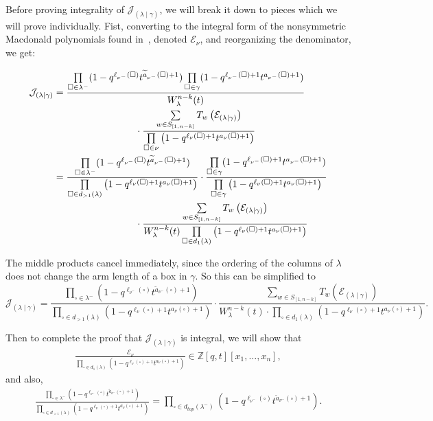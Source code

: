 \documentclass[ALCO]{cedram}
\newcommand{\Z}{\mathbb{Z}}
\newcommand{\Sn}{S_{[1,n-k]}}
\newcommand{\Symm}[1]{\sum\limits_{w\in \Sn} T_w \left( #1 \right)}
\newcommand{\JJ}{\mathcal{J}_{(\lambda \mid \gamma)}}
\newcommand{\nudom}{{( \lambda \mid \gamma )}}
\newcommand{\legnu}{{\ell_\nu(\square)}}
\newcommand{\legnumin}{{\ell_{\nu^-}(\square)}}
\newcommand{\armonenumin}{{\widetilde{a}_{\nu^-}(\square)}}
\newcommand{\armtwonu}{{a_\nu(\square)}}
\newcommand{\armtwonumin}{{a_{\nu^-}(\square)}}
\newcommand{\symmetricprod}{\prod\limits_{\square \in \lambda^-}}
\newcommand{\nonsymmetricprod}{\prod\limits_{\square \in \gamma}}
\begin{document}
Before proving integrality of $\JJ$, we will break it down to pieces which we will prove individually. Fist, converting to the integral form of the nonsymmetric Macdonald polynomials found in~\cite[Eqn. (6.11)]{MR2348910}, denoted $\mathcal{E}_\nu$, and reorganizing the denominator, we get:

\begin{align*}\JJ &= \frac{\symmetricprod (1-q^{\legnumin}t^{\armonenumin + 1}) \nonsymmetricprod(1-q^{\legnumin + 1}t^{\armtwonumin + 1})}{  W^{n-k}_\lambda(t)} \\ &\hspace*{3cm} \cdot \frac{\Symm{\mathcal{E}_\nudom}}{\prod\limits_{\square \in \nu} \left(1-q^{\legnu+1}t^{\armtwonu +1} \right)} \\
&= \frac{\symmetricprod (1-q^{\legnumin}t^{\armonenumin + 1}) }{  \prod\limits_{\square \in d_{>1}(\lambda)} \left(1-q^{\legnu+1}t^{\armtwonu +1} \right)  } \cdot \frac{\nonsymmetricprod(1-q^{\legnumin + 1}t^{\armtwonumin + 1})}{\prod\limits_{\square \in \gamma} \left(1-q^{\legnu+1}t^{\armtwonu +1} \right)}   \\
&\hspace*{3cm} \cdot  \frac{\Symm{\mathcal{E}_{(\lambda \mid \gamma)}}}{W^{n-k}_\lambda(t)\prod\limits_{\square \in d_1(\lambda)} \left(1-q^{\legnu+1}t^{\armtwonu +1} \right)} \end{align*}

The middle products cancel immediately, since the ordering of the columns of $\lambda$ does not change the arm length of a box in $\gamma$. So this can be simplified to
\begin{equation}\label{simplifiedJ} \JJ = \frac{\symmetricprod (1-q^{\legnumin}t^{\armonenumin + 1}) }{  \prod\limits_{\square \in d_{>1}(\lambda)} \left(1-q^{\legnu+1}t^{\armtwonu +1} \right)  } \cdot  \frac{\Symm{\mathcal{E}_{(\lambda \mid \gamma)}}}{W^{n-k}_\lambda(t)\cdot \prod\limits_{\square \in d_1(\lambda)} \left(1-q^{\legnu+1}t^{\armtwonu +1} \right)}. \end{equation}

Then to complete the proof that $\JJ$ is integral, we will show that
\begin{align}\label{HHLpiece} \frac{\mathcal{E}_\nu}{\prod\limits_{ \square \in d_1(\lambda) }(1-q^{\legnu+1}t^{\armtwonu +1})} \in \Z[q,t][x_1, \dotsc, x_n],\end{align}
and also,
\begin{align}\label{coefficientpiece} \frac{\symmetricprod (1-q^{\legnumin}t^{\armonenumin + 1}) }{  \prod\limits_{\square \in d_{>1}(\lambda)} \left(1-q^{\legnu+1}t^{\armtwonu +1} \right)  } = \prod\limits_{\square \in d_{top}(\lambda^-)} (1-q^\legnumin t^{\armonenumin + 1}). \end{align}
\end{document}
